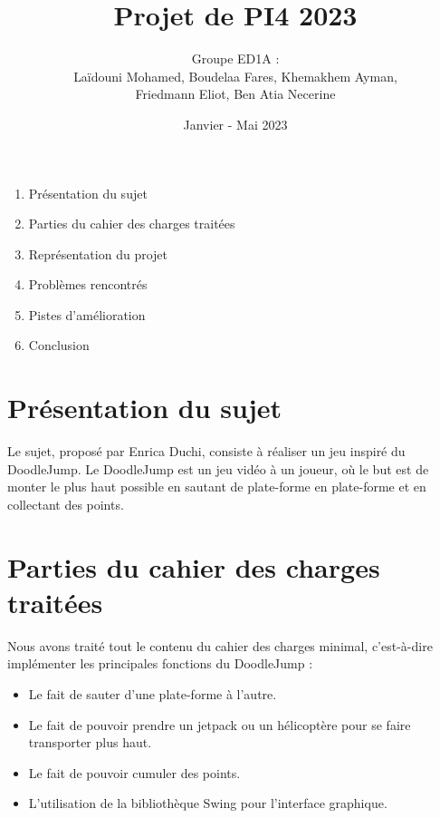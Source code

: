 \documentclass{article}
\title{Projet de PI4 2023}
\author{Groupe ED1A :\\Laïdouni Mohamed, Boudelaa Fares, Khemakhem Ayman,\\ Friedmann Eliot, Ben Atia Necerine}
\date{Janvier - Mai 2023}
\begin{document}
\maketitle

\begin{enumerate}
  \item Présentation du sujet
  \item Parties du cahier des charges traitées
  \item Représentation du projet
  \item Problèmes rencontrés
  \item Pistes d'amélioration
  \item Conclusion
\end{enumerate}

\section{Présentation du sujet}

Le sujet, proposé par Enrica Duchi, consiste à réaliser un jeu inspiré du DoodleJump. Le DoodleJump est un jeu vidéo à un joueur, où le but est de monter le plus haut possible en sautant de plate-forme en plate-forme et en collectant des points.

\section{Parties du cahier des charges traitées}
Nous avons traité tout le contenu du cahier des charges minimal, c'est-à-dire implémenter les principales fonctions du DoodleJump :
\begin{itemize}
    \item Le fait de sauter d'une plate-forme à l'autre.
    \item Le fait de pouvoir prendre un jetpack ou un hélicoptère pour se faire transporter plus haut.
    \item Le fait de pouvoir cumuler des points.
    \item L'utilisation de la bibliothèque Swing pour l'interface graphique.\\
\end{itemize}
\end{document}
